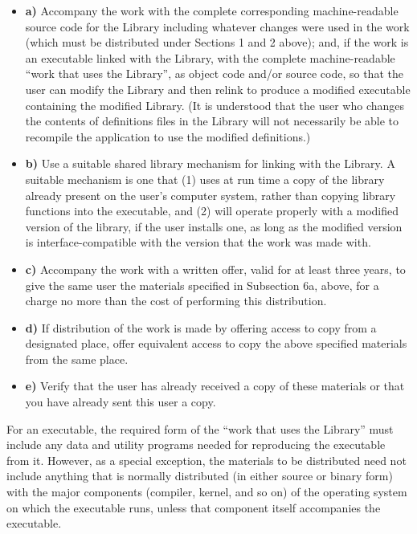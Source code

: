 \documentclass[]{article}
\providecommand{\tightlist}{%
  \setlength{\itemsep}{0pt}\setlength{\parskip}{0pt}}
\begin{document}
\begin{itemize}
\tightlist
\item
  \textbf{a)} Accompany the work with the complete corresponding
  machine-readable source code for the Library including whatever
  changes were used in the work (which must be distributed under
  Sections 1 and 2 above); and, if the work is an executable linked with
  the Library, with the complete machine-readable ``work that uses the
  Library'', as object code and/or source code, so that the user can
  modify the Library and then relink to produce a modified executable
  containing the modified Library. (It is understood that the user who
  changes the contents of definitions files in the Library will not
  necessarily be able to recompile the application to use the modified
  definitions.)
\item
  \textbf{b)} Use a suitable shared library mechanism for linking with
  the Library. A suitable mechanism is one that (1) uses at run time a
  copy of the library already present on the user's computer system,
  rather than copying library functions into the executable, and (2)
  will operate properly with a modified version of the library, if the
  user installs one, as long as the modified version is
  interface-compatible with the version that the work was made with.
\item
  \textbf{c)} Accompany the work with a written offer, valid for at
  least three years, to give the same user the materials specified in
  Subsection 6a, above, for a charge no more than the cost of performing
  this distribution.
\item
  \textbf{d)} If distribution of the work is made by offering access to
  copy from a designated place, offer equivalent access to copy the
  above specified materials from the same place.
\item
  \textbf{e)} Verify that the user has already received a copy of these
  materials or that you have already sent this user a copy.
\end{itemize}

For an executable, the required form of the ``work that uses the
Library'' must include any data and utility programs needed for
reproducing the executable from it. However, as a special exception, the
materials to be distributed need not include anything that is normally
distributed (in either source or binary form) with the major components
(compiler, kernel, and so on) of the operating system on which the
executable runs, unless that component itself accompanies the
executable.
\end{document}
